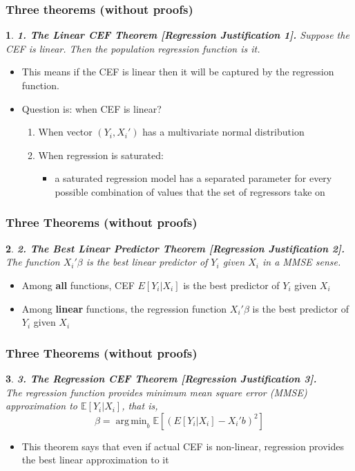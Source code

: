 \documentclass{beamer}
\theoremstyle{plain}
\newtheorem*{customthm}{} %
\newcommand{\customtheorem}[2]{
	\begin{customthm}
		\textbf{#1.} #2
	\end{customthm}
}
\DeclareMathOperator*{\argmin}{arg\,min}
\begin{document}
\begin{frame}
	\frametitle{Three theorems (without proofs)}
	\customtheorem{1. The Linear CEF Theorem [Regression Justification 1]}{
		Suppose the CEF is linear. Then the population regression function is it.}
	\begin{itemize}
		\item This means if the CEF is linear then it will be captured by the regression function.
		\item Question is: when CEF is linear?
		\begin{enumerate}
			\item When vector $(Y_i, X_i')$ has a multivariate normal distribution
			\item When regression is saturated:
			\begin{itemize}
				\item a saturated regression model has a separated parameter for every possible combination of values that the set of regressors take on
			\end{itemize}
		\end{enumerate}
	\end{itemize}
\end{frame}

\begin{frame}
	\frametitle{Three Theorems (without proofs)}
	\customtheorem{2. The Best Linear Predictor Theorem [Regression Justification 2]}{
	\\	The function $X_i'\beta$ is the best linear predictor of $Y_i$ given $X_i$ in a MMSE sense.}
	\begin{itemize}
		\item Among \textbf{all} functions, CEF $E[Y_i|X_i]$ is the best predictor of $Y_i$ given $X_i$
		\item Among \textbf{linear} functions, the regression function $X_i'\beta$ is the best predictor of $Y_i$ given $X_i$
	\end{itemize}
\end{frame}

\begin{frame}
	\frametitle{Three Theorems (without proofs)}
\customtheorem{3. The Regression CEF Theorem [Regression Justification 3]}{
		\\The regression function provides minimum mean square error (MMSE) approximation to $\mathbb E[Y_i|X_i]$, that is,
		$$ \beta = \argmin_b \mathbb E[(E[Y_i|X_i] - X_i'b)^2]$$}

	\begin{itemize}
		\item This theorem says that even if actual CEF is non-linear, regression provides the best linear approximation to it
	\end{itemize}
\end{frame}
\end{document}
